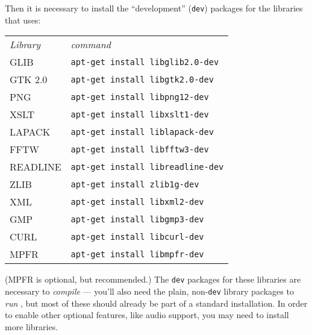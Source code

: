 Then it is necessary to install the ``development'' (\texttt{dev})
packages for the libraries that  uses:
\begin{center}
  \begin{tabular}{ll}
    \textit{Library} & \textit{command} \\ [4pt]
    GLIB     & \texttt{apt-get install libglib2.0-dev} \\
    GTK 2.0  & \texttt{apt-get install libgtk2.0-dev} \\
    PNG      & \texttt{apt-get install libpng12-dev} \\
    XSLT     & \texttt{apt-get install libxslt1-dev} \\
    LAPACK   & \texttt{apt-get install liblapack-dev} \\
    FFTW     & \texttt{apt-get install libfftw3-dev} \\
    READLINE & \texttt{apt-get install libreadline-dev} \\
    ZLIB     & \texttt{apt-get install zlib1g-dev} \\
    XML      & \texttt{apt-get install libxml2-dev} \\
    GMP      & \texttt{apt-get install libgmp3-dev} \\
    CURL     & \texttt{apt-get install libcurl-dev} \\
    MPFR     & \texttt{apt-get install libmpfr-dev}
  \end{tabular}
\end{center}

(MPFR is optional, but recommended.)  The \texttt{dev} packages for
these libraries are necessary to \emph{compile}  --- you'll
also need the plain, non-\texttt{dev} library packages to \emph{run}
, but most of these should already be part of a standard
installation.  In order to enable other optional features, like audio
support, you may need to install more libraries.


